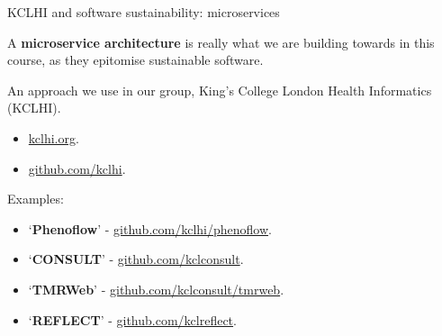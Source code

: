 \documentclass[10pt, dvipsnames, table, aspectratio=169]{beamer}
\begin{document}

\begin{frame}[fragile]{KCLHI and software sustainability: microservices}

A \textbf{microservice architecture} is really what we are building towards in this course, as they epitomise sustainable software.

An approach we use in our group, King's College London Health Informatics (KCLHI).

\begin{itemize}

    \item \href{https://kclhi.org}{kclhi.org}.
    
    \item \href{https://github.com/kclhi}{github.com/kclhi}.
    
\end{itemize}

Examples:

\begin{itemize}
    
    \item `\textbf{Phenoflow}' - \href{https://github.com/kclhi/phenoflow}{github.com/kclhi/phenoflow}.    
    \item `\textbf{CONSULT}' - \href{https://github.com/kclconsult}{github.com/kclconsult}.
    \item `\textbf{TMRWeb}' - \href{https://github.com/kclconsult/tmrweb}{github.com/kclconsult/tmrweb}.
    \item `\textbf{REFLECT}' - \href{https://github.com/kclreflect}{github.com/kclreflect}.
    
\end{itemize}

\end{frame}
\end{document}
